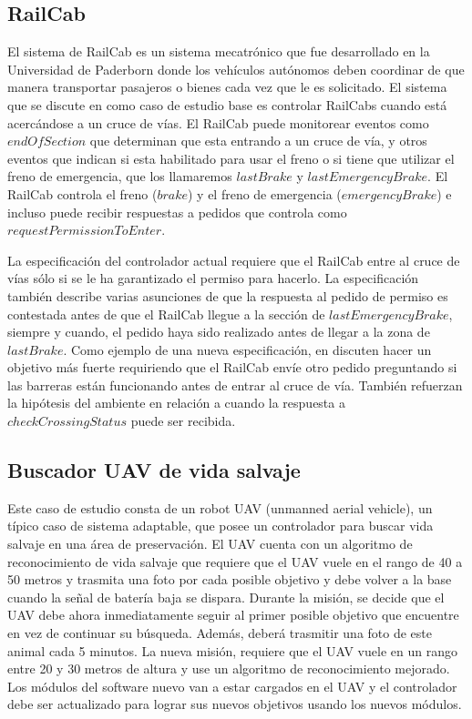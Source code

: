 \subsection{RailCab}

El sistema de RailCab es un sistema mecatrónico que fue desarrollado en la Universidad de Paderborn \cite{railcab} donde
los vehículos autónomos deben coordinar de que manera transportar pasajeros o bienes cada vez que le es solicitado. El
sistema que se discute en \cite{6224401} como caso de estudio base es controlar RailCabs cuando está acercándose a un
cruce de vías. El RailCab puede monitorear eventos como $endOfSection$ que determinan que esta entrando a un cruce de
vía, y otros eventos que indican si esta habilitado para usar el freno o si tiene que utilizar el freno de emergencia,
que los llamaremos $lastBrake$ y $lastEmergencyBrake$. El RailCab controla el freno ($brake$) y el freno de emergencia
($emergencyBrake$) e incluso puede recibir respuestas a pedidos que controla como $requestPermissionToEnter$.

La especificación del controlador actual requiere que el RailCab entre al cruce de vías sólo si se le ha garantizado el
permiso para hacerlo. La especificación también describe varias asunciones de que la respuesta al pedido de permiso es
contestada antes de que el RailCab llegue a la sección de $lastEmergencyBrake$, siempre y cuando, el pedido haya sido
realizado antes de llegar a la zona de $lastBrake$. Como ejemplo de una nueva especificación, en \cite{6224401} discuten
hacer un objetivo más fuerte requiriendo que el RailCab envíe otro pedido preguntando si las barreras están funcionando
antes de entrar al cruce de vía. También refuerzan la hipótesis del ambiente en relación a cuando la respuesta a
$checkCrossingStatus$ puede ser recibida.

\subsection{Buscador UAV de vida salvaje}
\label{buscador_UAV}

Este caso de estudio consta de un robot UAV (unmanned aerial vehicle), un típico caso de sistema adaptable, que posee un
controlador para buscar vida salvaje en una área de preservación. El UAV cuenta con un algoritmo de reconocimiento de
vida salvaje que requiere que el UAV vuele en el rango de 40 a 50 metros y trasmita una foto por cada posible objetivo y
debe volver a la base cuando la señal de batería baja se dispara. Durante la misión, se decide que el UAV debe ahora
inmediatamente seguir al primer posible objetivo que encuentre en vez de continuar su búsqueda. Además, deberá trasmitir
una foto de este animal cada 5 minutos. La nueva misión, requiere que el UAV vuele en un rango entre 20 y 30 metros de
altura y use un algoritmo de reconocimiento mejorado. Los módulos del software nuevo van a estar cargados en el UAV y el
controlador debe ser actualizado para lograr sus nuevos objetivos usando los nuevos módulos.

